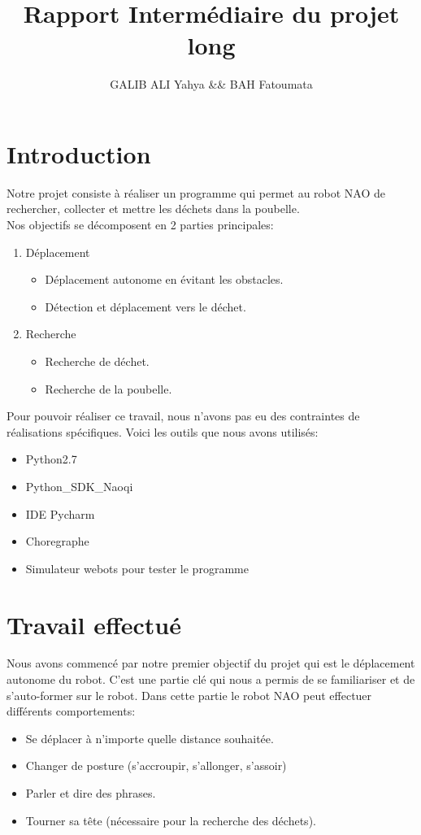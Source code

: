 \documentclass{article}
\title{Rapport Intermédiaire du projet long\\}
\author{GALIB ALI Yahya && BAH Fatoumata}
\begin{document}
\maketitle
{}
\section{Introduction}
Notre projet consiste à réaliser un programme qui permet au robot NAO de rechercher, collecter et mettre les déchets dans la poubelle.\\
Nos objectifs se décomposent en 2 parties principales:
\begin{enumerate}
   \item Déplacement
   \begin{itemize}
     \item Déplacement autonome en évitant les obstacles.
     \item Détection et déplacement vers le déchet.
   \end{itemize}
   \item Recherche 
   \begin{itemize}
       \item Recherche de déchet.
       \item Recherche de la poubelle.
   \end{itemize}
\end{enumerate}
Pour pouvoir réaliser ce travail, nous n'avons pas eu des contraintes de réalisations spécifiques. Voici les outils que nous avons utilisés:
 \begin{itemize}
       \item Python2.7
       \item Python\_SDK\_Naoqi
       \item IDE Pycharm
       \item Choregraphe
       \item Simulateur webots pour tester le programme
   \end{itemize}
\section{Travail effectué}
Nous avons commencé par notre premier objectif du projet qui est le déplacement autonome du robot. C'est une partie clé qui nous a permis de se familiariser et de s'auto-former sur le robot. Dans cette partie le robot NAO peut effectuer différents comportements:\\
 \begin{itemize}
       \item Se déplacer à n'importe quelle distance souhaitée.
       \item Changer de posture (s'accroupir, s'allonger, s'assoir)
       \item Parler et dire des phrases.
       \item Tourner sa tête (nécessaire pour la recherche des déchets).
   \end{itemize}
\end{document}
